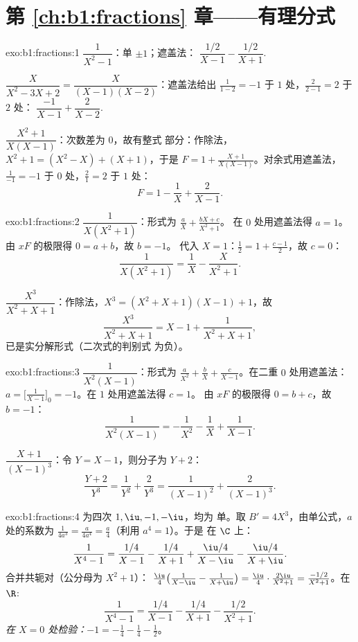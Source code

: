 \section*{第 \ref{ch:b1:fractions} 章——有理分式}

\begin{solution}{exo:b1:fractions:1}
$\dfrac{1}{X^2 - 1}$：单 $\pm 1$；遮盖法：
$\dfrac{1/2}{X-1} - \dfrac{1/2}{X+1}$.

$\dfrac{X}{X^2 - 3X + 2} = \dfrac{X}{(X-1)(X-2)}$：遮盖法给出
$\frac{1}{1-2} = -1$ 于 $1$ 处，$\frac{2}{2-1} = 2$ 于 $2$ 处：
$\dfrac{-1}{X-1} + \dfrac{2}{X-2}$.

$\dfrac{X^2+1}{X(X-1)}$：次数差为 $0$，故有整式
部分：作除法，$X^2 + 1 = (X^2 - X) + (X + 1)$，于是 $F = 1 +
\frac{X+1}{X(X-1)}$。对余式用遮盖法，$\frac{1}{-1} = -1$
于 $0$ 处，$\frac{2}{1} = 2$ 于 $1$ 处：
\[
F = 1 - \frac{1}{X} + \frac{2}{X-1} .
\]
\end{solution}

\begin{solution}{exo:b1:fractions:2}
$\dfrac{1}{X(X^2+1)}$：形式为 $\frac aX + \frac{bX + c}{X^2 + 1}$。
在 $0$ 处用遮盖法得 $a = 1$。由 $xF$ 的极限得 $0 = a + b$，故 $b = -1$。
代入 $X = 1$：$\frac12 = 1 + \frac{c - 1}{2}$，故 $c = 0$：
\[
\frac{1}{X(X^2+1)} = \frac 1X - \frac{X}{X^2+1} .
\]

$\dfrac{X^3}{X^2+X+1}$：作除法，$X^3 = (X^2+X+1)(X - 1) + 1$，故
\[
\frac{X^3}{X^2+X+1} = X - 1 + \frac{1}{X^2 + X + 1} ,
\]
已是实分解形式（二次式的判别式
为负）。
\end{solution}

\begin{solution}{exo:b1:fractions:3}
$\dfrac{1}{X^2(X-1)}$：形式为 $\frac{a}{X^2} + \frac bX +
\frac{c}{X-1}$。在二重 $0$ 处用遮盖法：
$a = \bigl[\frac{1}{X-1}\bigr]_{0} = -1$。在 $1$ 处用遮盖法得 $c = 1$。
由 $xF$ 的极限得 $0 = b + c$，故 $b = -1$：
\[
\frac{1}{X^2(X-1)} = -\frac{1}{X^2} - \frac1X + \frac{1}{X-1} .
\]

$\dfrac{X+1}{(X-1)^3}$：令 $Y = X - 1$，则分子为 $Y + 2$：
\[
\frac{Y + 2}{Y^3} = \frac{1}{Y^2} + \frac{2}{Y^3}
= \frac{1}{(X-1)^2} + \frac{2}{(X-1)^3} .
\]
\end{solution}

\begin{solution}{exo:b1:fractions:4}
为四次 $1, \iu, -1, -\iu$，均为
单。取 $B' = 4X^3$，由单公式，$a$ 处的系数为
$\frac{1}{4a^3} = \frac{a}{4a^4} = \frac a4$（利用 $a^4 = 1$）。于是
在 $\C$ 上：
\[
\frac{1}{X^4 - 1}
= \frac{1/4}{X - 1} - \frac{1/4}{X + 1}
+ \frac{\iu/4}{X - \iu} - \frac{\iu/4}{X + \iu} .
\]
合并共轭对（公分母为 $X^2 + 1$）：
$\frac{\iu}{4}\bigl(\frac{1}{X-\iu} - \frac{1}{X+\iu}\bigr) =
\frac{\iu}{4}\cdot\frac{2\iu}{X^2+1} = \frac{-1/2}{X^2+1}$。在
$\R$:
\[
\frac{1}{X^4 - 1}
= \frac{1/4}{X-1} - \frac{1/4}{X+1} - \frac{1/2}{X^2 + 1} .
\]
\emph{在 $X = 0$ 处检验：}$-1 = -\frac14 - \frac14 - \frac12$。
\end{solution}

